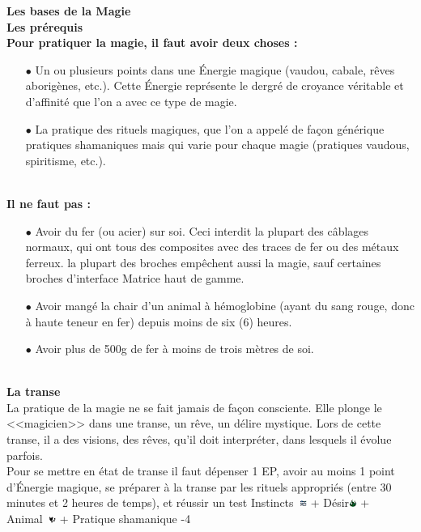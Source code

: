 \documentclass[11pt,twoside,a4paper]{article}
\def\imgINSTI{\includegraphics[width=0.25cm]{../../../../../imgGraphics/rolePlayingGame/SimulacreS/mini12x12/instinct.png} }
\def\imgDESIR{\includegraphics[width=0.25cm]{../../../../../imgGraphics/rolePlayingGame/SimulacreS/mini12x12/desir.png} }
\def\imgANIMA{\includegraphics[width=0.25cm]{../../../../../imgGraphics/rolePlayingGame/SimulacreS/mini12x12/animal.png} }
\begin{document}
\begin{multicols}{2}
{	\textbf{\Large Les bases de la Magie} ~\\
	\textbf{\large Les pr{\'e}requis} ~\\
	\textbf{\footnotesize Pour pratiquer la magie, il faut avoir deux choses : } %
	\begin{itemize}
		\item[$\bullet$] Un ou plusieurs points dans une {\'E}nergie magique (vaudou, cabale, r{\^e}ves aborig{\`e}nes, etc.). Cette {\'E}nergie repr{\'e}sente le dergr{\'e} de croyance v{\'e}ritable et d'affinit{\'e} que l'on a avec ce type de magie. %
		\item[$\bullet$] La pratique des rituels magiques, que l'on a appel{\'e} de fa\c{c}on g{\'e}n{\'e}rique pratiques shamaniques mais qui varie pour chaque magie (pratiques vaudous, spiritisme, etc.). %
	\end{itemize} ~\\
	\textbf{\footnotesize Il ne faut pas : } %
	\begin{itemize}
		\item[$\bullet$] Avoir du fer (ou acier) sur soi. Ceci interdit la plupart des c{\^a}blages normaux, qui ont tous des composites avec des traces de fer ou des m{\'e}taux ferreux. la plupart des broches emp{\^e}chent aussi la magie, sauf certaines broches d'interface Matrice haut de gamme.   
		\item[$\bullet$] Avoir mang{\'e} la chair d'un animal {\`a} h{\'e}moglobine (ayant du sang rouge, donc {\`a} haute teneur en fer) depuis moins de six (6) heures. 
		\item[$\bullet$] Avoir plus de 500g de fer {\`a} moins de trois m{\`e}tres de soi. 
	\end{itemize} ~\\
	\small
	\textbf{\large La transe} ~\\
	La pratique de la magie ne se fait jamais de fa\c{c}on consciente. Elle plonge le <<magicien>> dans une transe, un r{\^e}ve, un d{\'e}lire mystique. Lors de cette transe, il a des visions, des r{\^e}ves, qu'il doit interpr{\'e}ter, dans lesquels il {\'e}volue parfois. ~\\
	
	Pour se mettre en {\'e}tat de transe il faut d{\'e}penser 1 EP, avoir au moins 1 point d'{\'E}nergie magique, se pr{\'e}parer {\`a} la transe par les rituels appropri{\'e}s (entre 30 minutes et 2 heures de temps), et r{\'e}ussir un test Instincts~\imgINSTI + D{\'e}sir\imgDESIR + Animal~\imgANIMA + Pratique shamanique -4 ~\\
	
}
\end{multicols}
\end{document}
